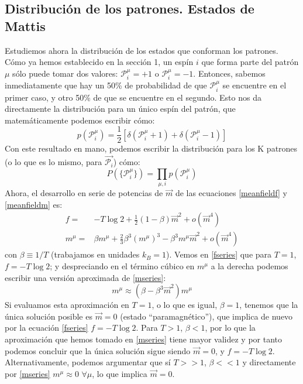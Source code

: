 \documentclass[titlepage,12pt]{article}
\numberwithin{equation}{section}
\begin{document}
	\subsection{Distribución de los patrones. Estados de Mattis}
	Estudiemos ahora la distribución de los estados que conforman los patrones. Cómo ya hemos establecido en la sección 1, un espín $i$ que forma parte del patrón $\mu$ sólo puede tomar dos valores: $\mathcal{P}^\mu_i=+1$ o $\mathcal{P}^\mu_i=-1$. Entonces, sabemos inmediatamente que hay un 50\% de probabilidad de que $\mathcal{P}^\mu_i$ se encuentre en el primer caso, y otro 50\% de que se encuentre en el segundo. Esto nos da directamente la distribución para un único espín del patrón, que matemáticamente podemos escribir cómo:
	\begin{equation}
	p(\mathcal{P}^\mu_i)=\frac{1}{2}\left[\delta(\mathcal{P}^\mu_i + 1) + \delta(\mathcal{P}^\mu_i - 1)\right]
	\label{distpatind}
	\end{equation}
	Con este resultado en mano, podemos escribir la distribución para los K patrones (o lo que es lo mismo, para $\vec{\mathcal{P}_i}$) cómo:
	\begin{equation}
	P(\lbrace\mathcal{P}^\mu_i\rbrace)=\prod_{\mu,i}p(\mathcal{P}^\mu_i)
	\label{distpat}
	\end{equation}
	Ahora, el desarrollo en serie de potencias de $\vec{m}$ de las ecuaciones \eqref{meanfieldf} y \eqref{meanfieldm} es:
	\begin{align}
	f=&-T\log 2 + \frac{1}{2}(1 - \beta)\vec{m}^2 + o(\vec{m}^4) \label{fseries}\\ m^\mu=&\beta m^\mu + \frac{2}{3}\beta^3 (m^\mu)^3 - \beta^3m^\mu\vec{m}^2 + o(\vec{m}^4) \label{mseries}
	\end{align}
	con $\beta\equiv1/T$ (trabajamos en unidades $k_B=1$). Vemos en \eqref{fseries} que para $T=1$, $f=-T\log2$; y despreciando en el término cúbico en $m^\mu$ a la derecha podemos escribir una versión aproximada de \eqref{mseries}:
	\begin{displaymath}
	m^\mu\approx(\beta-\beta^3\vec{m}^2)m^\mu
	\end{displaymath}
	Si evaluamos esta aproximación en $T=1$, o lo que es igual, $\beta=1$, tenemos que la única solución posible es $\vec{m}=0$ (estado ``paramagnético''), que implica de nuevo por la ecuación \eqref{fseries} $f=-T\log2$. Para $T>1$, $\beta<1$, por lo que la aproximación que hemos tomado en \eqref{mseries} tiene mayor validez y por tanto podemos concluir que la única solución sigue siendo $\vec{m}=0$, y $f=-T\log 2$. Alternativamente, podemos argumentar que sí $T >> 1$, $\beta << 1$ y directamente por \eqref{mseries} $m^\mu \approx 0\,\,\forall\mu$, lo que implica $\vec{m}=0$. 
	
\end{document}
